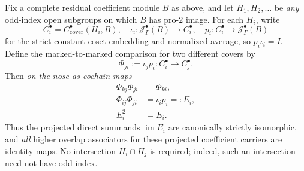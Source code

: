 \begin{theorem}
\label{thm:dyadic-f135-cross-sylow-strict-coherence}
Fix a complete
residual coefficient
module $B$ as above,
and let
$H_1,H_2,\ldots$
be \emph{any}
odd-index open
subgroups on which
$B$ has pro-$2$
image.
For each $H_i$,
write
\[
C_i^\bullet
=C_{\mathrm{cover}}^\bullet(H_i,B),
\quad
\iota_i:\mathcal J_\Gamma^\bullet(B)\to C_i^\bullet,
\quad
p_i:C_i^\bullet\to\mathcal J_\Gamma^\bullet(B)
\]
for the strict
constant-coset
embedding and
normalized average,
so $p_i\iota_i=I$.
Define the
marked-to-marked
comparison for
two different
covers by
\begin{equation}\label{eq:dyadic-f135-cover-change-operations}
\boxed{\qquad
\Phi_{ji}:=\iota_jp_i:
C_i^\bullet\longrightarrow C_j^\bullet.
\qquad}
\end{equation}
Then \emph{on the
nose as cochain maps}
\begin{equation}\label{eq:dyadic-f135-strict-transitive-odd-covers}
\boxed{
\begin{aligned}
\Phi_{kj}\Phi_{ji}&=\Phi_{ki},\\
\Phi_{ij}\Phi_{ji}
&=\iota_i p_i=:E_i,\\
E_i^2&=E_i.
\end{aligned}}
\end{equation}
Thus the projected
direct summands
$\operatorname{im}E_i$
are canonically
strictly isomorphic,
and \emph{all}
higher overlap
associators for
these projected
coefficient
carriers are
identity maps.
No intersection
$H_i\cap H_j$
is required;
indeed, such an
intersection
need not have
odd index.


\end{theorem}
